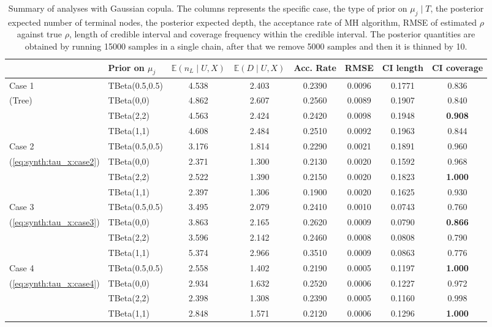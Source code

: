 \documentclass{amsart}
\begin{document}
\begin{table}[ht]
	\centering
	\caption{Summary of analyses with Gaussian copula. The columns represents the specific case, the type of prior on $\mu_j\mid T$, the posterior expected number of terminal nodes, the posterior expected depth, the acceptance rate of MH algorithm, RMSE of estimated $\rho$ against true $\rho$, length of credible interval and coverage frequency within the credible interval. The posterior quantities are obtained by running 15000 samples in a single chain, after that we remove 5000 samples and then it is thinned by 10.}
	\label{tab:gauss:summary}
	\scriptsize{
	\begin{tabular}{ll|cccccc}
		\toprule
		& Prior on $\mu_j$ & $\mathbb{E}(n_L\mid U,X)$ & $\mathbb{E}(D\mid U,X)$ & Acc. Rate & RMSE & CI length & CI coverage \\ 
		\midrule
		Case 1 & TBeta(0.5,0.5) & 4.538 & 2.403 & 0.2390 & 0.0096 & 0.1771 & 0.836 \\ 
		(Tree) & TBeta(0,0) & 4.862 & 2.607 & 0.2560 & 0.0089 & 0.1907 & 0.840 \\ 
		& TBeta(2,2) & 4.563 & 2.424 & 0.2420 & 0.0098 & 0.1948 & \textbf{0.908} \\ 
		& TBeta(1,1) & 4.608 & 2.484 & 0.2510 & 0.0092 & 0.1963 & 0.844 \\ 
		\midrule
		Case 2 & TBeta(0.5,0.5) & 3.176 & 1.814 & 0.2290 & 0.0021 & 0.1891 & 0.960 \\ 
		(\cref{eq:synth:tau_x:case2}) & TBeta(0,0) & 2.371 & 1.300 & 0.2130 & 0.0020 & 0.1592 & 0.968 \\ 
		& TBeta(2,2) & 2.522 & 1.390 & 0.2150 & 0.0020 & 0.1823 & \textbf{1.000} \\ 
		& TBeta(1,1) & 2.397 & 1.306 & 0.1900 & 0.0020 & 0.1625 & 0.930 \\ 
		\midrule
		Case 3 & TBeta(0.5,0.5) & 3.495 & 2.079 & 0.2410 & 0.0010 & 0.0743 & 0.760 \\ 
		(\cref{eq:synth:tau_x:case3}) & TBeta(0,0) & 3.863 & 2.165 & 0.2620 & 0.0009 & 0.0790 & \textbf{0.866} \\ 
		& TBeta(2,2) & 3.596 & 2.142 & 0.2460 & 0.0008 & 0.0808 & 0.790 \\ 
		& TBeta(1,1) & 5.374 & 2.966 & 0.3510 & 0.0009 & 0.0863 & 0.776 \\ 
		\midrule
		Case 4 & TBeta(0.5,0.5) & 2.558 & 1.402 & 0.2190 & 0.0005 & 0.1197 & \textbf{1.000} \\ 
		(\cref{eq:synth:tau_x:case4}) & TBeta(0,0) & 2.934 & 1.632 & 0.2520 & 0.0006 & 0.1227 & 0.972 \\ 
		& TBeta(2,2) & 2.398 & 1.308 & 0.2390 & 0.0005 & 0.1160 & 0.998 \\ 
		& TBeta(1,1) & 2.848 & 1.571 & 0.2120 & 0.0006 & 0.1296 & \textbf{1.000} \\ 
		\end{tabular}}
\end{table}
\end{document}
